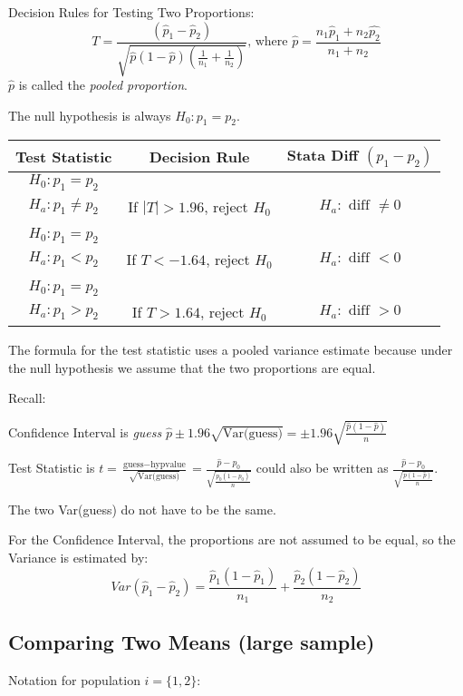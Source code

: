 \documentclass[11pt, oneside]{article}   	%
\begin{document}
Decision Rules for Testing Two Proportions:
\[
T = \frac{(\hat{p}_1 - \hat{p}_2) }  { \sqrt{ \hat{p}(1-\hat{p}) (\frac{1}{n_1} + \frac{1}{n_2}) }} \text{, where } \hat{p} = \frac{n_1\hat{p}_1 + n_2\hat{p_2} } {n_1 + n_2 }
\]
$\hat{p}$ is called the \textit{pooled proportion}.

The null hypothesis is always $H_0 : p_1 = p_2$.

 \begin{tabular}{ c  c c }
Test Statistic & Decision Rule & Stata Diff $(p_1 - p_2)$ \\
\hline
$H_0 : p_1 = p_2$ \\      $H_a : p_1 \neq p_2$ & If $|T| > 1.96$, reject $H_0$ & $H_a: \text{ diff } \neq 0$\\
 & \\
$H_0 : p_1 = p_2$ \\ $H_a : p_1 < p_2$      & If $T < -1.64$, reject $H_0$ & $H_a: \text{ diff } < 0$\\
 & \\
$H_0 : p_1 = p_2$ \\ $H_a : p_1 > p_2$      & If $T > 1.64$, reject $H_0$ & $H_a: \text{ diff } > 0$\\
\end{tabular}
The formula for the test statistic uses a pooled variance estimate because under the null hypothesis we assume that the two proportions are equal.

Recall:

Confidence Interval is \textit{guess} $\hat{p} \pm1.96 \sqrt{\text{Var(guess)}} = \pm 1.96 \sqrt { \frac{\hat{p}(1-\hat{p}) } { n}}$

Test Statistic is $t = \frac{\text{guess} - \text{hypvalue}} { \sqrt { \text{Var(guess)} } } = \frac{\hat{p} - p_0 } {\sqrt{\frac{p_0(1-p_0)} {n}}  } $ could also be written as $\frac{\hat{p} - p_0 } {\sqrt{\frac{\hat{p}(1-\hat{p})} {n}}  }  $.

The two Var(guess) do not have to be the same.

For the Confidence Interval, the proportions are not assumed to be equal, so the Variance is estimated by:
\[
Var(\hat{p}_1 - \hat{p}_2) = \frac{\hat{p}_1(1-\hat{p}_1)}{n_1} + \frac{\hat{p}_2(1-\hat{p}_2)}{n_2} 
\]

\subsection{Comparing Two Means (large sample)}

Notation for population $i = \{1, 2\}$:
\end{document}
